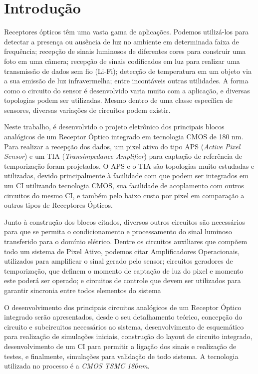 \chapter[Introdução]{Introdução}
Receptores ópticos têm uma vasta gama de aplicações. Podemos utilizá-los para detectar a presença ou ausência de luz no ambiente em determinada faixa de frequência; recepção de sinais luminosos de diferentes cores para construir uma foto em uma câmera; recepção de sinais codificados em luz para realizar uma transmissão de dados sem fio (Li-Fi); detecção de temperatura em um objeto via a sua emissão de luz infravermelha; entre incontáveis outras utilidades. A forma como o circuito do sensor é desenvolvido varia muito com a aplicação, e diversas topologias podem ser utilizadas. Mesmo dentro de uma classe específica de sensores, diversas variações de circuitos podem existir.

Neste trabalho, é desenvolvido o projeto eletrônico dos principais blocos analógicos de um Receptor \'Optico integrado em tecnologia CMOS de 180 nm. Para realizar a recepção dos dados, um pixel ativo do tipo APS (\textit{Active Pixel Sensor}) e um TIA (\textit{Transimpedance Amplifier}) para captação de refer\^encia de temporização foram projetados. O APS e o TIA são topologias muito estudadas e utilizadas, devido principalmente à facilidade com que podem ser integrados em um CI utilizando tecnologia CMOS, sua facilidade de acoplamento com outros circuitos do mesmo CI, e também pelo baixo custo por pixel em comparação a outros tipos de Receptores Ópticos. 

Junto à construção dos blocos citados, diversos outros circuitos são necessários para que se permita o condicionamento e processamento do sinal luminoso transferido para o domínio elétrico. Dentre os circuitos auxiliares que compõem todo um sistema de Pixel Ativo, podemos citar Amplificadores Operacionais, utilizados para amplificar o sinal gerado pelo sensor; circuitos geradores de temporização, que definem o momento de captação de luz do pixel e momento este poderá ser operado; e circuitos de controle que devem ser utilizados para garantir sincronia entre todos elementos do sistema

O desenvolvimento dos principais circuitos analógicos de um Receptor Óptico integrado serão apresentados, desde o seu detalhamento teórico, concepção do circuito e subcircuitos necessários ao sistema, desenvolvimento de esquemático para realização de simulações iniciais, construção do layout de circuito integrado, desenvolvimento de um CI para permitir a ligação dos sinais e realização de testes, e finalmente, simulações para validação de todo sistema. A tecnologia utilizada no processo é a \textit{CMOS TSMC 180nm}.

